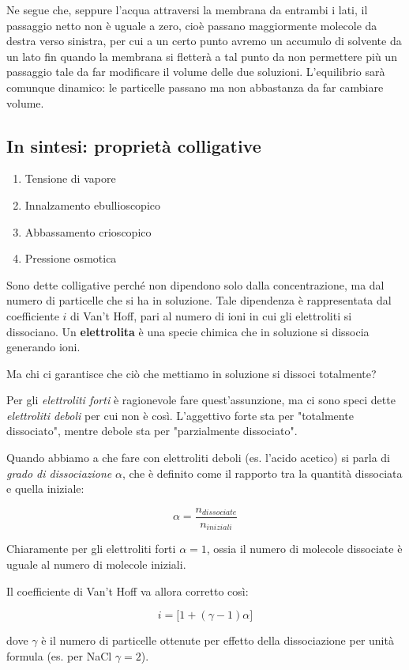 Ne segue che, seppure l'acqua attraversi la membrana da entrambi i lati, il passaggio netto non è uguale a zero, cioè passano maggiormente molecole da destra verso sinistra, per cui a un certo punto avremo un accumulo di solvente da un lato fin quando la membrana si fletterà a tal punto da non permettere più un passaggio tale da far modificare il volume delle due soluzioni. L'equilibrio sarà comunque dinamico: le particelle passano ma non abbastanza da far cambiare volume.

\subsection{In sintesi: proprietà colligative}
\begin{enumerate}
    \item Tensione di vapore
    \item Innalzamento ebullioscopico
    \item Abbassamento crioscopico
    \item Pressione osmotica
\end{enumerate}
Sono dette colligative perché non dipendono solo dalla concentrazione, ma dal numero di particelle che si ha in soluzione. Tale dipendenza è rappresentata dal coefficiente $i$ di Van't Hoff, pari al numero di ioni in cui gli elettroliti si dissociano. Un \textbf{elettrolita} è una specie chimica che in soluzione si dissocia generando ioni.

Ma chi ci garantisce che ciò che mettiamo in soluzione si dissoci totalmente?

Per gli \textit{elettroliti forti} è ragionevole fare quest'assunzione, ma ci sono speci dette \textit{elettroliti deboli} per cui non è così. L'aggettivo forte sta per "totalmente dissociato", mentre debole sta per "parzialmente dissociato".

Quando abbiamo a che fare con elettroliti deboli (es. l'acido acetico) si parla di \textit{grado di dissociazione} $\alpha$, che è definito come il rapporto tra la quantità dissociata e quella iniziale:

$$\alpha=\frac{n_{dissociate}}{n_{iniziali}}$$

Chiaramente per gli elettroliti forti $\alpha=1$, ossia il numero di molecole dissociate è uguale al numero di molecole iniziali.

Il coefficiente di Van't Hoff va allora corretto così:

$$i=\big[1 + (\gamma - 1)\alpha \big]$$

dove $\gamma$ è il numero di particelle ottenute per effetto della dissociazione per unità formula (es. per NaCl $\gamma=2$).

